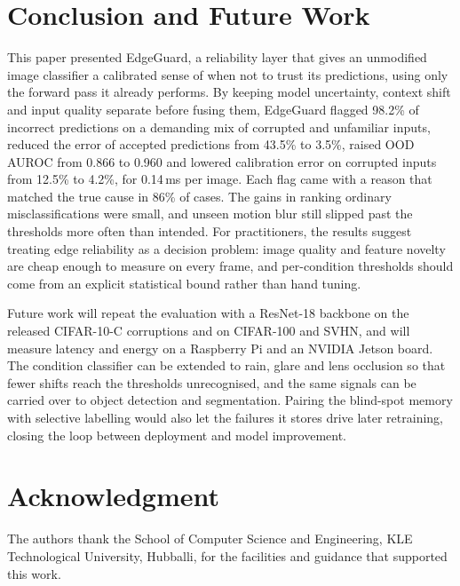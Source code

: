 \documentclass[conference]{IEEEtran}
\begin{document}
\section{Conclusion and Future Work}
\label{sec:conclusion}

This paper presented EdgeGuard, a reliability layer that gives an unmodified image classifier a calibrated sense of when not to trust its predictions, using only the forward pass it already performs. By keeping model uncertainty, context shift and input quality separate before fusing them, EdgeGuard flagged 98.2\% of incorrect predictions on a demanding mix of corrupted and unfamiliar inputs, reduced the error of accepted predictions from 43.5\% to 3.5\%, raised OOD AUROC from 0.866 to 0.960 and lowered calibration error on corrupted inputs from 12.5\% to 4.2\%, for 0.14\,ms per image. Each flag came with a reason that matched the true cause in 86\% of cases. The gains in ranking ordinary misclassifications were small, and unseen motion blur still slipped past the thresholds more often than intended. For practitioners, the results suggest treating edge reliability as a decision problem: image quality and feature novelty are cheap enough to measure on every frame, and per-condition thresholds should come from an explicit statistical bound rather than hand tuning.

Future work will repeat the evaluation with a ResNet-18 backbone on the released CIFAR-10-C corruptions and on CIFAR-100 and SVHN, and will measure latency and energy on a Raspberry Pi and an NVIDIA Jetson board. The condition classifier can be extended to rain, glare and lens occlusion so that fewer shifts reach the thresholds unrecognised, and the same signals can be carried over to object detection and segmentation. Pairing the blind-spot memory with selective labelling would also let the failures it stores drive later retraining, closing the loop between deployment and model improvement.

\section*{Acknowledgment}
The authors thank the School of Computer Science and Engineering, KLE Technological University, Hubballi, for the facilities and guidance that supported this work.
\end{document}
